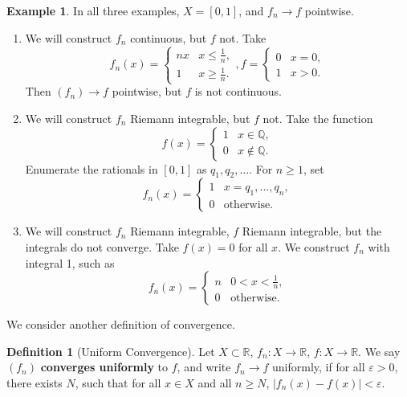\documentclass[12pt]{article}
\theoremstyle{definition}
\newtheorem{definition}{Definition}[section]
\newtheorem{example}{Example}[section]
\theoremstyle{remark}
\begin{document}
\begin{adjustbox}{minipage = \columnwidth - 25.5pt, margin=1em, frame=1pt, margin=0em}
\begin{example}
	In all three examples, $X = [0,1]$, and $f_n \to f$ pointwise.
	\begin{enumerate}[1.]
		\item We will construct $f_n$ continuous, but $f$ not. Take
			\[
				f_n(x) =
				\begin{cases}
					nx & x \leq \frac{1}{n}, \\
					1 & x \geq \frac{1}{n}.
				\end{cases},
				f =
				\begin{cases}
					0 & x = 0, \\
					1 & x > 0.
				\end{cases}
			\]
			Then $(f_n) \to f$ pointwise, but $f$ is not continuous.
		\item We will construct $f_n$ Riemann integrable, but $f$ not. Take the function
			\[
				f(x) =
				\begin{cases}
					1 & x \in \mathbb{Q}, \\
					0 & x \not \in \mathbb{Q}.
				\end{cases}
			\]
			Enumerate the rationals in $[0,1]$ as $q_1, q_2, \ldots$. For $n \geq 1$, set
			\[
				f_n(x) =
				\begin{cases}
					1 & x = q_1, \ldots, q_n, \\
					0 & \text{otherwise}.
				\end{cases}	
			\]
		\item We will construct $f_n$ Riemann integrable, $f$ Riemann integrable, but the integrals do not converge. Take $f(x) = 0$ for all $x$. We construct $f_n$ with integral 1, such as
			\[
				f_n(x) =
				\begin{cases}
					n & 0 < x < \frac{1}{n}, \\
					0 & \text{otherwise}.
				\end{cases}
			\]
	\end{enumerate}
	
\end{example}

\end{adjustbox}

We consider another definition of convergence.

\begin{definition}[Uniform Convergence]
	Let $X \subset \mathbb{R}$, $f_n : X \to \mathbb{R}$, $f : X \to \mathbb{R}$. We say $(f_n)$ \textbf{converges uniformly} to $f$, and write $f_n \to f$ uniformly, if for all $\varepsilon > 0$, there exists $N$, such that for all $x \in X$ and all $n \geq N$, $|f_n(x) - f(x)| < \varepsilon$.
\end{definition}
\end{document}
